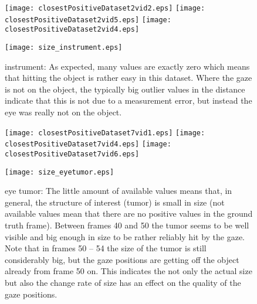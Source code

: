 \begin{figure}[ht]
	  \texttt{[image: closestPositiveDataset2vid2.eps]}
	  \texttt{[image: closestPositiveDataset2vid5.eps]}
	  \texttt{[image: closestPositiveDataset2vid4.eps]}
	  
	  \vspace{3mm}
	  \texttt{[image: size\_instrument.eps]}
	  \caption{instrument: As expected, many values are exactly zero which means that hitting the object is rather easy in this dataset. Where the gaze is not on the object, the typically big outlier values in the distance indicate that this is not due to a measurement error, but instead the eye was really not on the object.}
	\label{fig:distanceToClosestPositiveD2}
\end{figure}

\begin{figure}[ht]
	  \texttt{[image: closestPositiveDataset7vid1.eps]}
	  \texttt{[image: closestPositiveDataset7vid4.eps]}
	  \texttt{[image: closestPositiveDataset7vid6.eps]}
	  
	  \vspace{3mm}
	  \texttt{[image: size\_eyetumor.eps]}	  
	  \caption{eye tumor: The little amount of available values means that, in general, the structure of interest (tumor) is small in size (not available values mean that there are no positive values in the ground truth frame). Between frames 40 and 50 the tumor seems to be well visible and big enough in size to be rather reliably hit by the gaze. Note that in frames 50 -- 54 the size of the tumor is still considerably big, but the gaze positions are getting off the object already from frame 50 on. This indicates the not only the actual size but also the change rate of size has an effect on the quality of the gaze positions.}
	\label{fig:distanceToClosestPositiveD7}
\end{figure}

